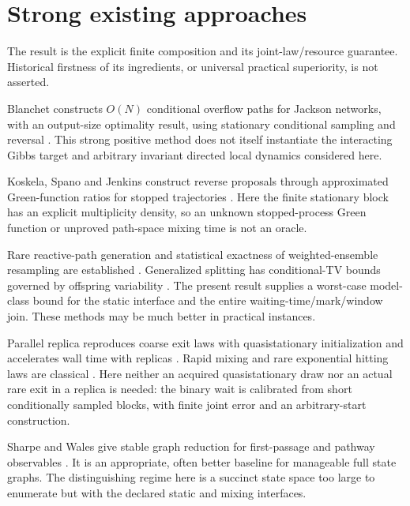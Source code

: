 \section{Strong existing approaches}
The result is the explicit finite composition and its joint-law/resource guarantee. Historical firstness of its ingredients, or universal practical superiority, is not asserted.
\begin{description}[style=nextline,leftmargin=0pt,labelsep=0pt]
\item[Optimal conditional overflow sampling.]
Blanchet constructs $O(N)$ conditional overflow paths for Jackson networks, with an output-size optimality result, using stationary conditional sampling and reversal \cite{blanchet}. This strong positive method does not itself instantiate the interacting Gibbs target and arbitrary invariant directed local dynamics considered here.
\item[Reverse-time sequential Monte Carlo.]
Koskela, Spano and Jenkins construct reverse proposals through approximated Green-function ratios for stopped trajectories \cite{koskela}. Here the finite stationary block has an explicit multiplicity density, so an unknown stopped-process Green function or unproved path-space mixing time is not an oracle.
\item[Transition paths, weighted ensembles and splitting.]
Rare reactive-path generation and statistical exactness of weighted-ensemble resampling are established \cite{ops,we}. Generalized splitting has conditional-TV bounds governed by offspring variability \cite{botev}. The present result supplies a worst-case model-class bound for the static interface and the entire waiting-time/mark/window join. These methods may be much better in practical instances.
\item[Parallel replica and exponential laws.]
Parallel replica reproduces coarse exit laws with quasistationary initialization and accelerates wall time with replicas \cite{parrep}. Rapid mixing and rare exponential hitting laws are classical \cite{aldous,zweimuller}. Here neither an acquired quasistationary draw nor an actual rare exit in a replica is needed: the binary wait is calibrated from short conditionally sampled blocks, with finite joint error and an arbitrary-start construction.
\item[Explicit state reduction.]
Sharpe and Wales give stable graph reduction for first-passage and pathway observables \cite{sharpe}. It is an appropriate, often better baseline for manageable full state graphs. The distinguishing regime here is a succinct state space too large to enumerate but with the declared static and mixing interfaces.
\end{description}

